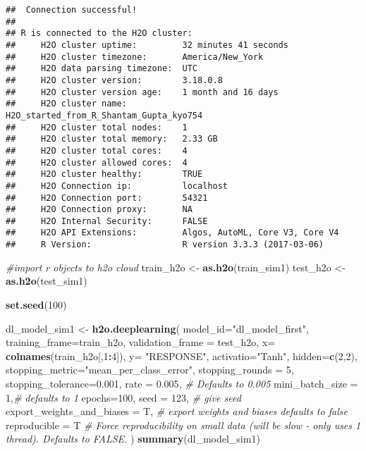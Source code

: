 \documentclass[]{article}
\newenvironment{Shaded}{\begin{snugshade}}{\end{snugshade}}
\newcommand{\KeywordTok}[1]{\textcolor[rgb]{0.13,0.29,0.53}{\textbf{#1}}}
\newcommand{\DataTypeTok}[1]{\textcolor[rgb]{0.13,0.29,0.53}{#1}}
\newcommand{\DecValTok}[1]{\textcolor[rgb]{0.00,0.00,0.81}{#1}}
\newcommand{\FloatTok}[1]{\textcolor[rgb]{0.00,0.00,0.81}{#1}}
\newcommand{\StringTok}[1]{\textcolor[rgb]{0.31,0.60,0.02}{#1}}
\newcommand{\CommentTok}[1]{\textcolor[rgb]{0.56,0.35,0.01}{\textit{#1}}}
\newcommand{\OperatorTok}[1]{\textcolor[rgb]{0.81,0.36,0.00}{\textbf{#1}}}
\newcommand{\NormalTok}[1]{#1}
\begin{document}
\begin{verbatim}
##  Connection successful!
## 
## R is connected to the H2O cluster: 
##     H2O cluster uptime:         32 minutes 41 seconds 
##     H2O cluster timezone:       America/New_York 
##     H2O data parsing timezone:  UTC 
##     H2O cluster version:        3.18.0.8 
##     H2O cluster version age:    1 month and 16 days  
##     H2O cluster name:           H2O_started_from_R_Shantam_Gupta_kyo754 
##     H2O cluster total nodes:    1 
##     H2O cluster total memory:   2.33 GB 
##     H2O cluster total cores:    4 
##     H2O cluster allowed cores:  4 
##     H2O cluster healthy:        TRUE 
##     H2O Connection ip:          localhost 
##     H2O Connection port:        54321 
##     H2O Connection proxy:       NA 
##     H2O Internal Security:      FALSE 
##     H2O API Extensions:         Algos, AutoML, Core V3, Core V4 
##     R Version:                  R version 3.3.3 (2017-03-06)
\end{verbatim}

\begin{Shaded}
\begin{Highlighting}[]
\CommentTok{#import r objects to h2o cloud}
\NormalTok{train_h2o <-}\StringTok{ }\KeywordTok{as.h2o}\NormalTok{(train_sim1)}
\NormalTok{test_h2o <-}\StringTok{ }\KeywordTok{as.h2o}\NormalTok{(test_sim1)}

\KeywordTok{set.seed}\NormalTok{(}\DecValTok{100}\NormalTok{)}

\NormalTok{dl_model_sim1 <-}\StringTok{ }\KeywordTok{h2o.deeplearning}\NormalTok{(}
  \DataTypeTok{model_id=}\StringTok{"dl_model_first"}\NormalTok{, }
  \DataTypeTok{training_frame=}\NormalTok{train_h2o, }
  \DataTypeTok{validation_frame =}\NormalTok{ test_h2o,}
  \DataTypeTok{x=} \KeywordTok{colnames}\NormalTok{(train_h2o[,}\DecValTok{1}\OperatorTok{:}\DecValTok{4}\NormalTok{]),}
  \DataTypeTok{y=} \StringTok{"RESPONSE"}\NormalTok{,}
  \DataTypeTok{activatio=}\StringTok{"Tanh"}\NormalTok{,  }
  \DataTypeTok{hidden=}\KeywordTok{c}\NormalTok{(}\DecValTok{2}\NormalTok{,}\DecValTok{2}\NormalTok{), }
  \DataTypeTok{stopping_metric=}\StringTok{"mean_per_class_error"}\NormalTok{,}
  \DataTypeTok{stopping_rounds =} \DecValTok{5}\NormalTok{,}
  \DataTypeTok{stopping_tolerance=}\FloatTok{0.001}\NormalTok{,}
  \DataTypeTok{rate =} \FloatTok{0.005}\NormalTok{, }\CommentTok{# Defaults to 0.005}
  \DataTypeTok{mini_batch_size =} \DecValTok{1}\NormalTok{,}\CommentTok{# defaults to 1 }
  \DataTypeTok{epochs=}\DecValTok{100}\NormalTok{,}
  \DataTypeTok{seed =} \DecValTok{123}\NormalTok{, }\CommentTok{# give seed }
  \DataTypeTok{export_weights_and_biases =}\NormalTok{ T, }\CommentTok{# export weights and biases defaults to false}
  \DataTypeTok{reproducible =}\NormalTok{ T }\CommentTok{# Force reproducibility on small data (will be slow - only uses 1 thread). Defaults to FALSE.}
\NormalTok{)}
\KeywordTok{summary}\NormalTok{(dl_model_sim1)}
\end{Highlighting}
\end{Shaded}
\end{document}
